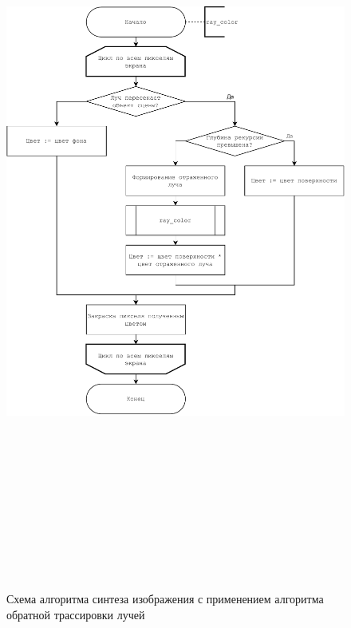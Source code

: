             \begin{figure}
                \centering
                \includegraphics[width=\textwidth,height=25cm,keepaspectratio]{inc/img/ray_tracing.pdf}
                \caption{Схема алгоритма синтеза изображения с применением алгоритма обратной трассировки лучей} \label{fig:ray_tracing}
            \end{figure}

